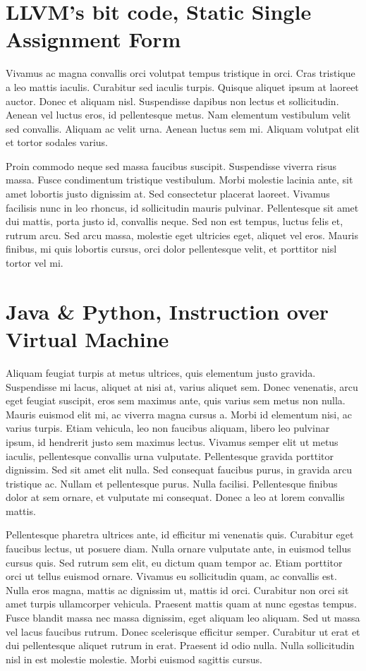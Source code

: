\section{LLVM's bit code, Static Single Assignment Form}
Vivamus ac magna convallis orci volutpat tempus tristique in orci. Cras tristique a leo mattis iaculis. Curabitur sed iaculis turpis. Quisque aliquet ipsum at laoreet auctor. Donec et aliquam nisl. Suspendisse dapibus non lectus et sollicitudin. Aenean vel luctus eros, id pellentesque metus. Nam elementum vestibulum velit sed convallis. Aliquam ac velit urna. Aenean luctus sem mi. Aliquam volutpat elit et tortor sodales varius.

Proin commodo neque sed massa faucibus suscipit. Suspendisse viverra risus massa. Fusce condimentum tristique vestibulum. Morbi molestie lacinia ante, sit amet lobortis justo dignissim at. Sed consectetur placerat laoreet. Vivamus facilisis nunc in leo rhoncus, id sollicitudin mauris pulvinar. Pellentesque sit amet dui mattis, porta justo id, convallis neque. Sed non est tempus, luctus felis et, rutrum arcu. Sed arcu massa, molestie eget ultricies eget, aliquet vel eros. Mauris finibus, mi quis lobortis cursus, orci dolor pellentesque velit, et porttitor nisl tortor vel mi.


\section{Java \& Python, Instruction over Virtual Machine}
Aliquam feugiat turpis at metus ultrices, quis elementum justo gravida. Suspendisse mi lacus, aliquet at nisi at, varius aliquet sem. Donec venenatis, arcu eget feugiat suscipit, eros sem maximus ante, quis varius sem metus non nulla. Mauris euismod elit mi, ac viverra magna cursus a. Morbi id elementum nisi, ac varius turpis. Etiam vehicula, leo non faucibus aliquam, libero leo pulvinar ipsum, id hendrerit justo sem maximus lectus. Vivamus semper elit ut metus iaculis, pellentesque convallis urna vulputate. Pellentesque gravida porttitor dignissim. Sed sit amet elit nulla. Sed consequat faucibus purus, in gravida arcu tristique ac. Nullam et pellentesque purus. Nulla facilisi. Pellentesque finibus dolor at sem ornare, et vulputate mi consequat. Donec a leo at lorem convallis mattis.

Pellentesque pharetra ultrices ante, id efficitur mi venenatis quis. Curabitur eget faucibus lectus, ut posuere diam. Nulla ornare vulputate ante, in euismod tellus cursus quis. Sed rutrum sem elit, eu dictum quam tempor ac. Etiam porttitor orci ut tellus euismod ornare. Vivamus eu sollicitudin quam, ac convallis est. Nulla eros magna, mattis ac dignissim ut, mattis id orci. Curabitur non orci sit amet turpis ullamcorper vehicula. Praesent mattis quam at nunc egestas tempus. Fusce blandit massa nec massa dignissim, eget aliquam leo aliquam. Sed ut massa vel lacus faucibus rutrum. Donec scelerisque efficitur semper. Curabitur ut erat et dui pellentesque aliquet rutrum in erat. Praesent id odio nulla. Nulla sollicitudin nisl in est molestie molestie. Morbi euismod sagittis cursus.
